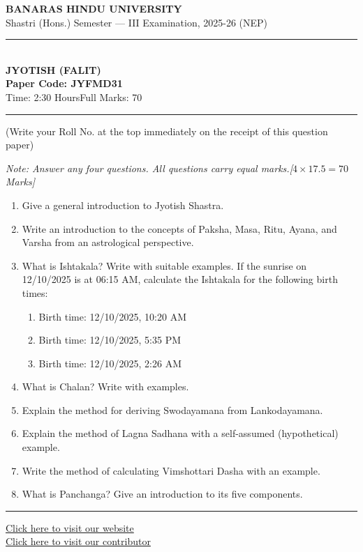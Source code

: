 \documentclass[11pt,a4paper]{article}
\begin{document}
\begin{center}
  {\large\bfseries BANARAS HINDU UNIVERSITY}\\[2pt]
  {\normalsize Shastri (Hons.) Semester --- III Examination, 2025-26 (NEP)}\\[6pt]
  \rule{0.8\linewidth}{0.5pt}\\[6pt]
  {\large\bfseries JYOTISH (FALIT)}\\[4pt]
  {\large\bfseries Paper Code: JYFMD31}\\[4pt]
  {\normalsize Time: 2:30 Hours\hfill Full Marks: 70}
\end{center}

\rule{\linewidth}{0.4pt}

\smallskip



\noindent (Write your Roll No. at the top immediately on the receipt of this question paper)

\smallskip



\noindent   \textit{Note: Answer any four questions. All questions carry equal marks.\hfill [$4  \times 17.5 = 70$ Marks]}

\bigskip


\begin{enumerate}[label=   \textbf{\arabic*.}]
    \item Give a general introduction to Jyotish Shastra.

    \item Write an introduction to the concepts of Paksha, Masa, Ritu, Ayana, and Varsha from an astrological perspective.

    \item What is Ishtakala? Write with suitable examples. If the sunrise on 12/10/2025 is at 06:15 AM, calculate the Ishtakala for the following birth times:
    
\begin{enumerate}[label=(\alph*)]
        \item Birth time: 12/10/2025, 10:20 AM
        \item Birth time: 12/10/2025, 5:35 PM
        \item Birth time: 12/10/2025, 2:26 AM
    \end{enumerate}

    \item What is Chalan? Write with examples.

    \item Explain the method for deriving Swodayamana from Lankodayamana.

    \item Explain the method of Lagna Sadhana with a self-assumed (hypothetical) example.

    \item Write the method of calculating Vimshottari Dasha with an example.

    \item What is Panchanga? Give an introduction to its five components.
\end{enumerate}

\vfill
\rule{\linewidth}{0.4pt}

\begin{center}\small
\href{https://bhu-exam.vercel.app/}{Click here to visit our website}\\[4pt]
\href{https://me-aryan.vercel.app/}{Click here to visit our contributor}
\end{center}
\end{document}
